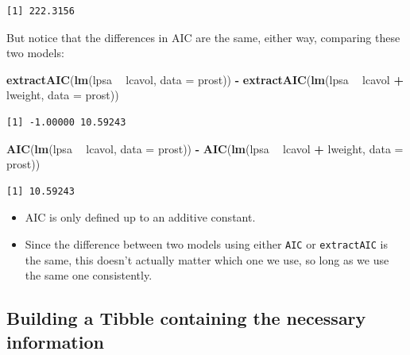 \documentclass[]{book}
\newenvironment{Shaded}{\begin{snugshade}}{\end{snugshade}}
\newcommand{\KeywordTok}[1]{\textcolor[rgb]{0.13,0.29,0.53}{\textbf{#1}}}
\newcommand{\DataTypeTok}[1]{\textcolor[rgb]{0.13,0.29,0.53}{#1}}
\newcommand{\StringTok}[1]{\textcolor[rgb]{0.31,0.60,0.02}{#1}}
\newcommand{\OperatorTok}[1]{\textcolor[rgb]{0.81,0.36,0.00}{\textbf{#1}}}
\newcommand{\NormalTok}[1]{#1}
\providecommand{\tightlist}{%
  \setlength{\itemsep}{0pt}\setlength{\parskip}{0pt}}
\theoremstyle{definition}
\theoremstyle{definition}
\theoremstyle{definition}
\theoremstyle{remark}
\begin{document}
\begin{verbatim}
[1] 222.3156
\end{verbatim}

But notice that the differences in AIC are the same, either way,
comparing these two models:

\begin{Shaded}
\begin{Highlighting}[]
\KeywordTok{extractAIC}\NormalTok{(}\KeywordTok{lm}\NormalTok{(lpsa }\OperatorTok{~}\StringTok{ }\NormalTok{lcavol, }\DataTypeTok{data =}\NormalTok{ prost)) }\OperatorTok{-}\StringTok{ }\KeywordTok{extractAIC}\NormalTok{(}\KeywordTok{lm}\NormalTok{(lpsa }\OperatorTok{~}\StringTok{ }\NormalTok{lcavol }\OperatorTok{+}\StringTok{ }\NormalTok{lweight, }\DataTypeTok{data =}\NormalTok{ prost))}
\end{Highlighting}
\end{Shaded}

\begin{verbatim}
[1] -1.00000 10.59243
\end{verbatim}

\begin{Shaded}
\begin{Highlighting}[]
\KeywordTok{AIC}\NormalTok{(}\KeywordTok{lm}\NormalTok{(lpsa }\OperatorTok{~}\StringTok{ }\NormalTok{lcavol, }\DataTypeTok{data =}\NormalTok{ prost)) }\OperatorTok{-}\StringTok{ }\KeywordTok{AIC}\NormalTok{(}\KeywordTok{lm}\NormalTok{(lpsa }\OperatorTok{~}\StringTok{ }\NormalTok{lcavol }\OperatorTok{+}\StringTok{ }\NormalTok{lweight, }\DataTypeTok{data =}\NormalTok{ prost))}
\end{Highlighting}
\end{Shaded}

\begin{verbatim}
[1] 10.59243
\end{verbatim}

\begin{itemize}
\tightlist
\item
  AIC is only defined up to an additive constant.
\item
  Since the difference between two models using either \texttt{AIC} or
  \texttt{extractAIC} is the same, this doesn't actually matter which
  one we use, so long as we use the same one consistently.
\end{itemize}

\subsection{Building a Tibble containing the necessary
information}\label{building-a-tibble-containing-the-necessary-information}
\end{document}
